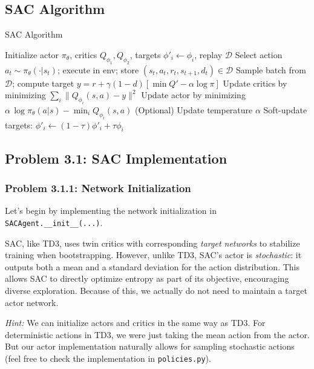 \documentclass[12pt]{article}
\begin{document}
\subsection*{SAC Algorithm}
\begin{algorithm}
\caption{SAC Algorithm}
\begin{algorithmic}[1]
\State Initialize actor \(\pi_\theta\), critics \(Q_{\phi_1}, Q_{\phi_2}\), targets \(\phi'_i\leftarrow\phi_i\), replay \(\mathcal{D}\)
  \State Select action \(a_t\sim\pi_\theta(\cdot|s_t)\); execute in env; store \((s_t,a_t,r_t,s_{t+1},d_t)\in\mathcal{D}\)
      \State Sample batch from \(\mathcal{D}\); compute target \(y=r+\gamma(1-d)[\min Q' - \alpha\log\pi]\)
      \State Update critics by minimizing \(\sum_i \|Q_{\phi_i}(s,a)-y\|^2\)
      \State Update actor by minimizing \(\alpha\,\log\pi_\theta(a|s) - \min_i Q_{\phi_i}(s,a)\)
      \State (Optional) Update temperature \(\alpha\)
      \State Soft-update targets: \(\phi'_i\leftarrow (1-\tau)\phi'_i + \tau\phi_i\)
    \EndFor
  \EndIf
\EndFor
\end{algorithmic}
\end{algorithm}

\subsection*{Problem 3.1: SAC Implementation}
\subsubsection*{Problem 3.1.1: Network Initialization}

Let’s begin by implementing the network initialization in \texttt{SACAgent.\_\_init\_\_(...)}.

SAC, like TD3, uses twin critics with corresponding \emph{target networks} to stabilize training when bootstrapping. However, unlike TD3, SAC’s actor is \emph{stochastic}: it outputs both a mean and a standard deviation for the action distribution. This allows SAC to directly optimize entropy as part of its objective, encouraging diverse exploration. Because of this, we actually do not need to maintain a target actor network.

\textit{Hint:}  We can initialize actors and critics in the same way as TD3.  For deterministic actions in TD3, we were just taking the mean action from the actor.  But our actor implementation naturally allows for sampling stochastic actions (feel free to check the implementation in \texttt{policies.py}).
\end{document}
